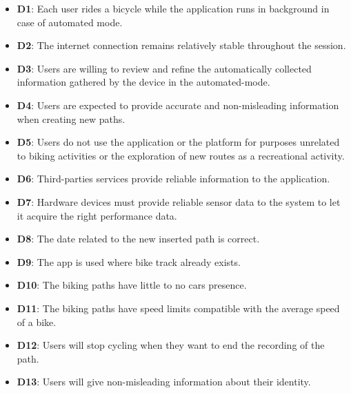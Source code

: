 \begin{itemize}
    \item \textbf{D1}: Each user rides a bicycle while the application runs in background in case of automated mode.
    \item \textbf{D2}: The internet connection remains relatively stable throughout the session.
    \item \textbf{D3}: Users are willing to review and refine the automatically collected information gathered by the device in the automated-mode.
    \item \textbf{D4}: Users are expected to provide accurate and non-misleading information when creating new paths.
    \item \textbf{D5}: Users do not use the application or the platform for purposes unrelated to biking activities or the exploration of new routes as a recreational activity.
    \item \textbf{D6}: Third-parties services provide reliable information to the application.
    \item \textbf{D7}: Hardware devices must provide reliable sensor data to the system to let it acquire the right performance data.
    \item \textbf{D8}: The date related to the new inserted path is correct.
    \item \textbf{D9}: The app is used where bike track already exists.
    \item \textbf{D10}: The biking paths have little to no cars presence.
    \item \textbf{D11}: The biking paths have speed limits compatible with the average speed of a bike.
    \item \textbf{D12}: Users will stop cycling when they want to end the recording of the path.
    \item \textbf{D13}: Users will give non-misleading information about their identity.
\end{itemize}




